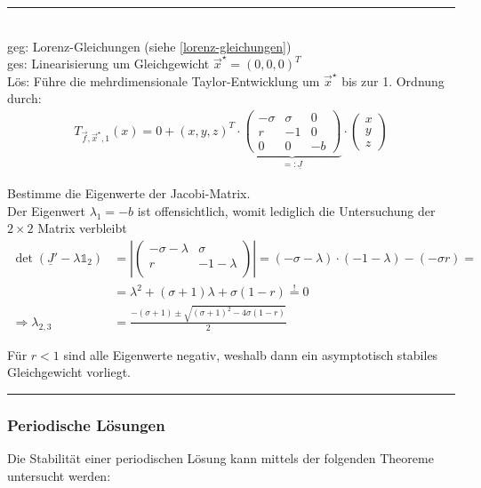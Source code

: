 \documentclass{article}
\begin{document}
{\color{blue}
\hrule
	\\
	geg: Lorenz-Gleichungen (siehe \ref{lorenz-gleichungen})\\
	ges: Linearisierung um Gleichgewicht $\vec{x}^\star = (0,0,0)^T$ \\
	Lös: Führe die mehrdimensionale Taylor-Entwicklung um $\vec{x}^\star$ bis zur 1. Ordnung durch:
		\begin{align*}
			T_{\vec{f},\vec{x}^\star,1}(x) = 0 + (x,y,z)^T \cdot
			\underbrace{
			\begin{pmatrix}
				-\sigma & \sigma & 0 \\
				r & -1 & 0 \\
				0 & 0 & -b
			\end{pmatrix}
			}_{=:\underline{J}}
			\cdot
			\begin{pmatrix}
				x \\ y \\ z
			\end{pmatrix}
		\end{align*}

	Bestimme die Eigenwerte der Jacobi-Matrix.\\
	Der Eigenwert $\lambda_1 = -b$ ist offensichtlich, womit lediglich die Untersuchung der $2 \times 2$ Matrix verbleibt
		\begin{align*}
			\det(\underline{J}' - \lambda \mathbb{1}_2) &=
			\left| 
			\begin{pmatrix}
				-\sigma - \lambda & \sigma \\
				r & -1 - \lambda \\
			\end{pmatrix}
			\right|
			=
			(-\sigma - \lambda) \cdot (-1 - \lambda) - (-\sigma r) = \\
			&=\lambda^2 + (\sigma+1)\lambda + \sigma(1-r) \stackrel{!}{=} 0 \\
			\Rightarrow \lambda_{2,3} &= \frac{-(\sigma+1)\pm\sqrt{(\sigma+1)^2-4\sigma(1-r)}}{2} 
	\end{align*}
	
	Für $r<1$ sind alle Eigenwerte negativ, weshalb dann ein asymptotisch stabiles Gleichgewicht vorliegt.\\
	
	
	


\hrule
}


\newpage


\subsubsection{Periodische Lösungen}
Die Stabilität einer periodischen Lösung kann mittels der folgenden Theoreme untersucht werden:
\end{document}
